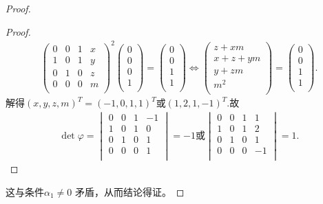 \documentclass[../../main.tex]{subfiles}
\begin{document}
\begin{proof}
\begin{proof}
\begin{align*}
\begin{pmatrix}
0&		0&		1&		x\\
1&		0&		1&		y\\
0&		1&		0&		z\\
0&		0&		0&		m\\
\end{pmatrix}^2 \left( \begin{array}{c}
0\\
0\\
0\\
1\\
\end{array} \right) =\left( \begin{array}{c}
0\\
0\\
1\\
1\\
\end{array} \right) \Longleftrightarrow \left( \begin{array}{c}
z+xm\\
x+z+ym\\
y+zm\\
m^2\\
\end{array} \right) =\left( \begin{array}{c}
0\\
0\\
1\\
1\\
\end{array} \right) .
\end{align*}
解得$(x,y,z,m)^T=(-1,0,1,1)^T$或$(1,2,1,-1)^T$.故
\begin{align*}
\det \varphi=\begin{vmatrix}
0&		0&		1&		-1\\
1&		0&		1&		0\\
0&		1&		0&		1\\
0&		0&		0&		1\\
\end{vmatrix}=-1\text{或}\begin{vmatrix}
0&		0&		1&		1\\
1&		0&		1&		2\\
0&		1&		0&		1\\
0&		0&		0&		-1\\
\end{vmatrix}=1.
\end{align*}

\end{proof}这与条件$\alpha_1 \neq 0$ 矛盾，从而结论得证。

\end{proof}
\end{document}
